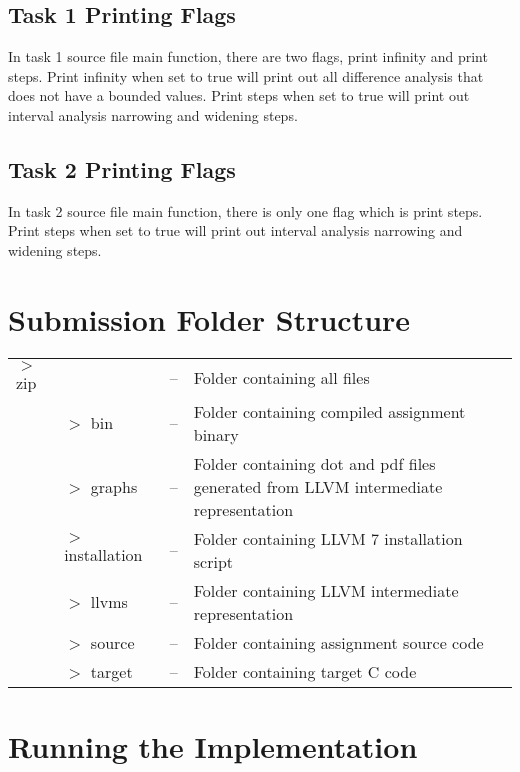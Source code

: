 \documentclass[11pt,a4paper,fleqn]{article}
\begin{document}
\subsection {Task 1 Printing Flags}

In task 1 source file main function, there are two flags, print infinity and print steps.
Print infinity when set to true will print out all difference analysis that does not have a bounded values.
Print steps when set to true will print out interval analysis narrowing and widening steps.

\subsection {Task 2 Printing Flags}

In task 2 source file main function, there is only one flag which is print steps.
Print steps when set to true will print out interval analysis narrowing and widening steps.

\section{Submission Folder Structure}

\begin{tabularx}{\linewidth}{l l l X}
   $>$ zip &                  & -- & Folder containing all files                                                         \\
           & $>$ bin          & -- & Folder containing compiled assignment binary                                        \\
           & $>$ graphs       & -- & Folder containing dot and pdf files generated from LLVM intermediate representation \\
           & $>$ installation & -- & Folder containing LLVM 7 installation script                                        \\
           & $>$ llvms        & -- & Folder containing LLVM intermediate representation                                  \\
           & $>$ source       & -- & Folder containing assignment source code                                            \\
           & $>$ target       & -- & Folder containing target C code                                                     \\
\end{tabularx}

\section {Running the Implementation}
\end{document}
